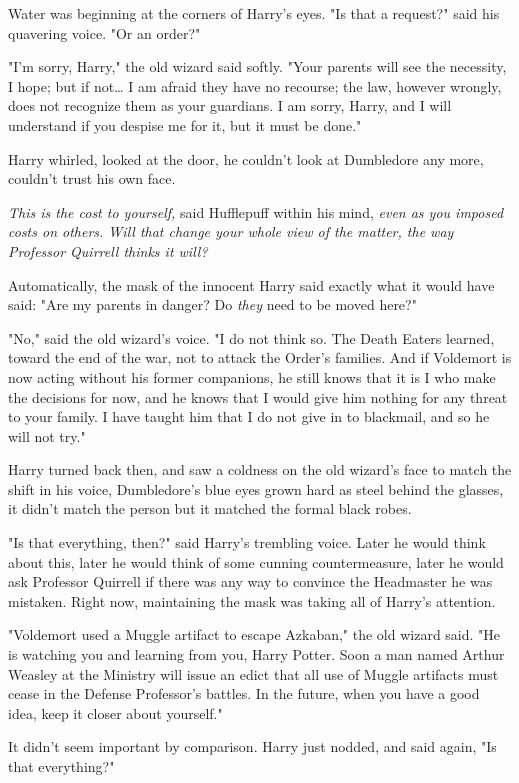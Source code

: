 Water was beginning at the corners of Harry's eyes. "Is that a request?" said 
his quavering voice. "Or an order?"

"I'm sorry, Harry," the old wizard said softly. "Your parents will see the 
necessity, I hope; but if not{\ldots} I am afraid they have no recourse; the 
law, however wrongly, does not recognize them as your guardians. I am sorry, 
Harry, and I will understand if you despise me for it, but it must be done."

Harry whirled, looked at the door, he couldn't look at Dumbledore any more, 
couldn't trust his own face.

\emph{This is the cost to yourself,} said Hufflepuff within his mind, 
\emph{even as you imposed costs on others. Will that change your whole view of 
the matter, the way Professor Quirrell thinks it will?}

Automatically, the mask of the innocent Harry said exactly what it would have 
said: "Are my parents in danger? Do \emph{they} need to be moved here?"

"No," said the old wizard's voice. "I do not think so. The Death Eaters 
learned, toward the end of the war, not to attack the Order's families. And if 
Voldemort is now acting without his former companions, he still knows that it 
is I who make the decisions for now, and he knows that I would give him nothing 
for any threat to your family. I have taught him that I do not give in to 
blackmail, and so he will not try."

Harry turned back then, and saw a coldness on the old wizard's face to match 
the shift in his voice, Dumbledore's blue eyes grown hard as steel behind the 
glasses, it didn't match the person but it matched the formal black robes.

"Is that everything, then?" said Harry's trembling voice. Later he would think 
about this, later he would think of some cunning countermeasure, later he would 
ask Professor Quirrell if there was any way to convince the Headmaster he was 
mistaken. Right now, maintaining the mask was taking all of Harry's attention.

"Voldemort used a Muggle artifact to escape Azkaban," the old wizard said. "He 
is watching you and learning from you, Harry Potter. Soon a man named Arthur 
Weasley at the Ministry will issue an edict that all use of Muggle artifacts 
must cease in the Defense Professor's battles. In the future, when you have a 
good idea, keep it closer about yourself."

It didn't seem important by comparison. Harry just nodded, and said again, "Is 
that everything?"

